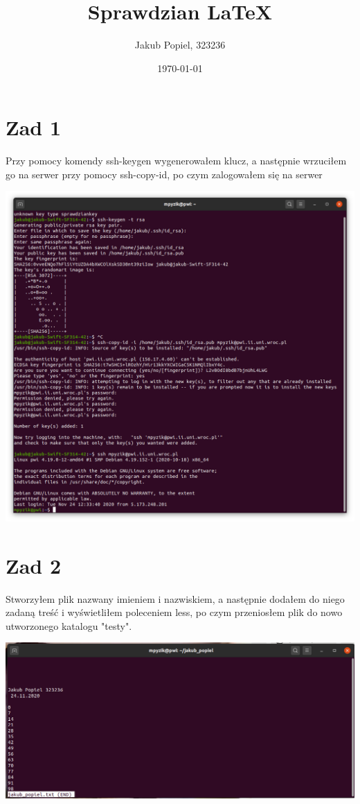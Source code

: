 \documentclass[a4paper]{article}
\author{Jakub Popiel, 323236}
\title{Sprawdzian \LaTeX}
\date{\today}
\begin{document}
\maketitle


\section{Zad 1}
Przy pomocy komendy ssh-keygen wygenerowałem klucz, a następnie wrzuciłem go na  serwer przy pomocy ssh-copy-id, po czym zalogowałem się na serwer


\includegraphics[scale=0.48]{Screenshot from 2020-11-24 12-34-56.png} 





\section{Zad 2}
Stworzyłem plik nazwany imieniem i nazwiskiem, a następnie dodałem do niego zadaną treść i wyświetliłem poleceniem less, po czym przeniosłem plik do nowo utworzonego katalogu "testy".

\includegraphics[scale=0.4]{Screenshot from 2020-11-24 12-51-07.png} 
\end{document}
